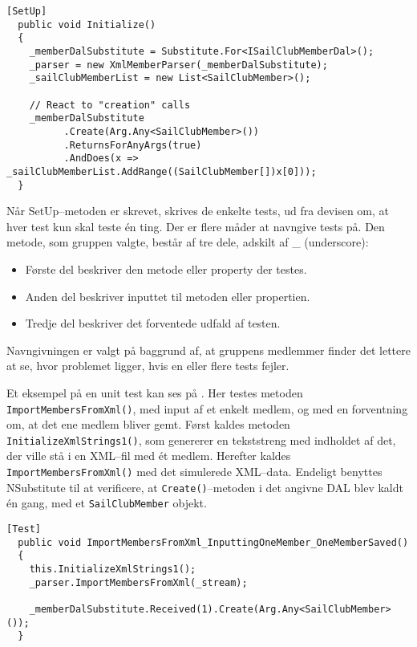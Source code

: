 \begin{lstlisting}[frame=single, caption=Eksempel på Unit test SetUp, label=unit_test_setup]
  [SetUp]
  public void Initialize()
  {
    _memberDalSubstitute = Substitute.For<ISailClubMemberDal>();
    _parser = new XmlMemberParser(_memberDalSubstitute);
    _sailClubMemberList = new List<SailClubMember>();
    
    // React to "creation" calls
    _memberDalSubstitute
          .Create(Arg.Any<SailClubMember>())
          .ReturnsForAnyArgs(true)
          .AndDoes(x => _sailClubMemberList.AddRange((SailClubMember[])x[0]));
  }
\end{lstlisting}

Når SetUp--metoden er skrevet, skrives de enkelte tests, ud fra devisen om, at hver test kun skal teste én ting.
Der er flere måder at navngive tests på.
Den metode, som gruppen valgte, består af tre dele, adskilt af \_ (underscore):

\begin{itemize}
  \item Første del beskriver den metode eller property der testes.
  \item Anden del beskriver inputtet til metoden eller propertien.
  \item Tredje del beskriver det forventede udfald af testen.
\end{itemize}

Navngivningen er valgt på baggrund af, at gruppens medlemmer finder det lettere at se, hvor problemet ligger, hvis en eller flere tests fejler.

Et eksempel på en unit test kan ses på .
Her testes metoden \texttt{ImportMembersFromXml()}, med input af et enkelt medlem, og med en forventning om, at det ene medlem bliver gemt.
Først kaldes metoden \texttt{InitializeXmlStrings1()}, som genererer en tekststreng med indholdet af det, der ville stå i en XML--fil med ét medlem.
Herefter kaldes \texttt{ImportMembersFromXml()} med det simulerede XML--data.
Endeligt benyttes NSubstitute til at verificere, at \texttt{Create()}--metoden i det angivne \ac{DAL} blev kaldt én gang, med et \texttt{SailClubMember} objekt.

\begin{lstlisting}[frame=single, caption=Eksempel på Unit test, label=unit_test]
  [Test]
  public void ImportMembersFromXml_InputtingOneMember_OneMemberSaved()
  {
    this.InitializeXmlStrings1();
    _parser.ImportMembersFromXml(_stream);
    
    _memberDalSubstitute.Received(1).Create(Arg.Any<SailClubMember>());
  }
\end{lstlisting}

